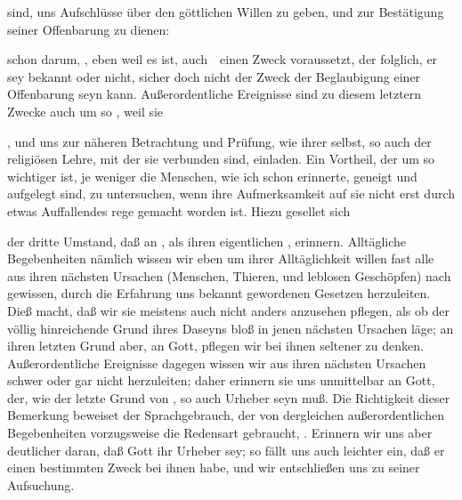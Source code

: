 sind, uns Aufschlüsse über den göttlichen Willen zu geben, und zur Bestätigung seiner Offenbarung zu dienen:
\begin{aufza}
\item {} schon darum, , eben weil es  ist, auch~\ einen  Zweck voraussetzt, der folglich, er sey bekannt oder nicht, sicher doch nicht der Zweck der Beglaubigung einer Offenbarung seyn kann. Außerordentliche Ereignisse sind zu diesem letztern Zwecke auch um so , weil sie
\item {}, und uns zur näheren Betrachtung und Prüfung, wie ihrer selbst, so auch der religiösen Lehre, mit der sie verbunden sind, einladen. Ein Vortheil, der um so wichtiger ist, je weniger die Menschen, wie ich schon  erinnerte, geneigt und aufgelegt sind,  zu untersuchen, wenn ihre Aufmerksamkeit auf sie nicht erst durch etwas Auffallendes rege gemacht worden ist. Hiezu gesellet sich
\item der dritte Umstand, daß  an , als ihren eigentlichen , erinnern. Alltägliche Begebenheiten nämlich wissen wir eben um ihrer Alltäglichkeit willen fast alle aus ihren nächsten Ursachen (Menschen, Thieren, und leblosen Geschöpfen) nach gewissen, durch die Erfahrung uns bekannt gewordenen Gesetzen herzuleiten. Dieß macht, daß wir sie meistens auch nicht anders anzusehen pflegen, als ob der völlig hinreichende Grund ihres Daseyns bloß in jenen nächsten Ursachen läge; an ihren letzten Grund aber, an Gott, pflegen wir bei ihnen seltener zu denken. Außerordentliche Ereignisse dagegen wissen wir aus ihren nächsten Ursachen schwer oder gar nicht herzuleiten; daher erinnern sie uns unmittelbar an Gott, der, wie der letzte Grund von , so auch  Urheber seyn muß. Die Richtigkeit dieser Bemerkung beweiset der Sprachgebrauch, der von dergleichen außerordentlichen Begebenheiten vorzugsweise die Redensart gebraucht, . Erinnern wir uns aber deutlicher daran, daß Gott ihr Urheber sey; so fällt uns auch leichter ein, daß er einen bestimmten Zweck bei ihnen habe, und wir entschließen uns zu seiner Aufsuchung.

\end{aufza}
